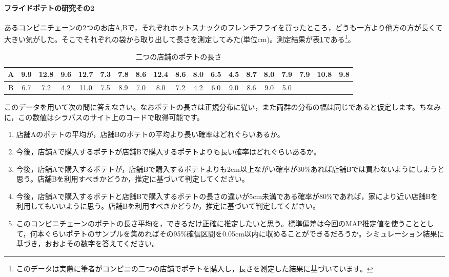 \documentclass{ltjsbook}
\begin{document}
\paragraph{フライドポテトの研究その2}
あるコンビニチェーンの2つのお店A,Bで，それぞれホットスナックのフレンチフライを買ったところ，どうも一方より他方の方が長くて大きい気がした。そこでそれぞれの袋から取り出して長さを測定してみた(単位cm)。測定結果が表\ref{tab:20_01}である\footnote{このデータは実際に筆者がコンビニの二つの店舗でポテトを購入し，長さを測定した結果に基づいています。}。
\begin{table}[ht]
	\center
	\caption{二つの店舗のポテトの長さ}
	\begin{tabular}{c|cccccccccccccccccc}\hline
		A & 9.9 & 12.8 & 9.6 & 12.7 & 7.3 & 7.8 & 8.6 & 12.4 & 8.6 & 8.0 & 6.5 & 4.5 & 8.7 & 8.0 & 7.9 & 7.9 & 10.8 & 9.8 \\\hline
		B & 6.7 & 7.2  & 4.2 & 11.0 & 7.5 & 8.9 & 7.0 & 8.0  & 7.2 & 4.2 & 6.0 & 9.0 & 8.6 & 9.0 & 5.0 &     &     &     \\\hline
	\end{tabular}
	\label{tab:20_01}
\end{table}
このデータを用いて次の問に答えなさい。なおポテトの長さは正規分布に従い，また両群の分布の幅は同じであると仮定します。ちなみに，この数値はシラバスのサイト上のコードで取得可能です。
\begin{enumerate}
	\item 店舗Aのポテトの平均が，店舗Bのポテトの平均より長い確率はどれぐらいあるか。
	\item 今後，店舗Aで購入するポテトが店舗Bで購入するポテトよりも長い確率はどれぐらいあるか。
	\item 今後，店舗Aで購入するポテトが，店舗Bで購入するポテトよりも2cm以上ながい確率が30\%あれば店舗Bでは買わないようにしようと思う。店舗Bを利用すべきかどうか，推定に基づいて判定してください。
	\item 今後，店舗Aで購入するポテトと店舗Bで購入するポテトの長さの違いが5cm未満である確率が80\%であれば，家により近い店舗Bを利用してもいいように思う。店舗Bを利用すべきかどうか，推定に基づいて判定してください。
	\item このコンビニチェーンのポテトの長さ平均を，できるだけ正確に推定したいと思う。標準偏差は今回のMAP推定値を使うこととして，何本ぐらいポテトのサンプルを集めればその95\%確信区間を0.05cm以内に収めることができるだろうか。シミュレーション結果に基づき，おおよその数字を答えてください。
\end{enumerate}
\end{document}

